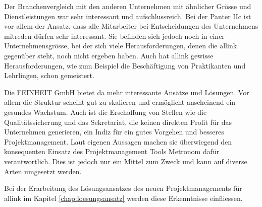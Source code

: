 Der Branchenvergleich mit den anderen Unternehmen mit ähnlicher Grösse und
Dienstleistungen war sehr interessant und aufschlussreich. Bei der Panter IIc
ist vor allem der Ansatz, dass alle Mitarbeiter bei Entscheidungen des 
Unternehmens mitreden dürfen sehr interessant. Sie befinden sich jedoch noch
in einer Unternehmensgrösse, bei der sich viele Herausforderungen, denen die allink 
gegenüber steht, noch nicht ergeben haben. Auch hat allink gewisse Herausforderungen,
wie zum Beispiel die Beschäftigung von Praktikanten und Lehrlingen, schon gemeistert.

Die FEINHEIT GmbH bietet da mehr interessante Ansätze und Lösungen. Vor allem
die Struktur scheint gut zu skalieren und ermöglicht anscheinend ein gesundes Wachstum.
Auch ist die Erschaffung von Stellen wie die Qualitätssicherung und das Sekretariat,
die keinen direkten Profit für das Unternehmen generieren, ein Indiz für ein
gutes Vorgehen und besseres Projektmanagement. Laut eigenen Aussagen machen sie
überwiegend den konsequenten Einsatz des Projektmanagement Tools Metronom dafür
verantwortlich. Dies ist jedoch nur ein Mittel zum Zweck und kann auf
diverse Arten umgesetzt werden.

Bei der Erarbeitung des Lösungsansatzes des neuen Projektmanagements für allink 
im Kapitel \ref{chap:loesungsansatz} werden diese Erkenntnisse einfliessen.
